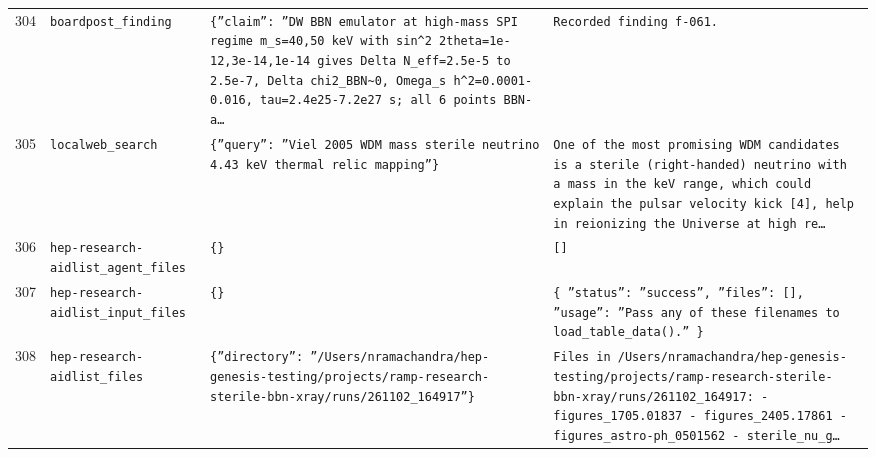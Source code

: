 \documentclass[11pt,a4paper]{article}
\begin{document}
\begin{longtable}{@{}p{}p{}p{}p{}@{}}
304 & \texttt{board}\newline\texttt{post\_\allowbreak{}finding} & \texttt{\{''claim'':\allowbreak{} ''DW BBN emulator at high-mass SPI regime m\_\allowbreak{}s=\allowbreak{}40,\allowbreak{}50 keV with sin\textasciicircum{}\allowbreak{}2 2theta=\allowbreak{}1e-12,\allowbreak{}3e-14,\allowbreak{}1e-14 gives Delta N\_\allowbreak{}eff=\allowbreak{}2.5e-5 to 2.5e-7,\allowbreak{} Delta chi2\_\allowbreak{}BBN\textasciitilde{}\allowbreak{}0,\allowbreak{} Omega\_\allowbreak{}s h\textasciicircum{}\allowbreak{}2=\allowbreak{}0.0001-0.016,\allowbreak{} tau=\allowbreak{}2.4e25-7.2e27 s;\allowbreak{} all 6 points BBN-a\ldots{}\allowbreak{}} & \texttt{Recorded finding f-061.} \\
305 & \texttt{local}\newline\texttt{web\_\allowbreak{}search} & \texttt{\{''query'':\allowbreak{} ''Viel 2005 WDM mass sterile neutrino 4.43 keV thermal relic mapping''\}\allowbreak{}} & \texttt{One of the most promising WDM candidates is a sterile (right-handed)\allowbreak{} neutrino with a mass in the keV range,\allowbreak{} which could explain the pulsar velocity kick [4]\allowbreak{},\allowbreak{} help in reionizing the Universe at high re\ldots{}\allowbreak{}} \\
306 & \texttt{hep-research-aid}\newline\texttt{list\_\allowbreak{}agent\_\allowbreak{}files} & \texttt{\{\}\allowbreak{}} & \texttt{[]\allowbreak{}} \\
307 & \texttt{hep-research-aid}\newline\texttt{list\_\allowbreak{}input\_\allowbreak{}files} & \texttt{\{\}\allowbreak{}} & \texttt{\{   ''status'':\allowbreak{} ''success'',\allowbreak{}   ''files'':\allowbreak{} []\allowbreak{},\allowbreak{}   ''usage'':\allowbreak{} ''Pass any of these filenames to load\_\allowbreak{}table\_\allowbreak{}data()\allowbreak{}.'' \}\allowbreak{}} \\
308 & \texttt{hep-research-aid}\newline\texttt{list\_\allowbreak{}files} & \texttt{\{''directory'':\allowbreak{} ''/\allowbreak{}Users/\allowbreak{}nramachandra/\allowbreak{}hep-genesis-testing/\allowbreak{}projects/\allowbreak{}ramp-research-sterile-bbn-xray/\allowbreak{}runs/\allowbreak{}261102\_\allowbreak{}164917''\}\allowbreak{}} & \texttt{Files in /\allowbreak{}Users/\allowbreak{}nramachandra/\allowbreak{}hep-genesis-testing/\allowbreak{}projects/\allowbreak{}ramp-research-sterile-bbn-xray/\allowbreak{}runs/\allowbreak{}261102\_\allowbreak{}164917:\allowbreak{}   - figures\_\allowbreak{}1705.01837   - figures\_\allowbreak{}2405.17861   - figures\_\allowbreak{}astro-ph\_\allowbreak{}0501562   - sterile\_\allowbreak{}nu\_\allowbreak{}g\ldots{}\allowbreak{}} \\

\end{longtable}
\end{document}

